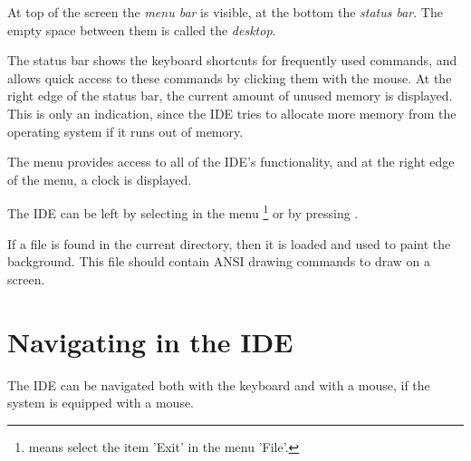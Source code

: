 
At top of the screen the \emph{menu bar} is visible, at the bottom
the \emph{status bar}. The empty space between them is called the
\emph{desktop}.

The status bar shows the keyboard shortcuts for frequently used
commands, and allows quick access to these commands by clicking
them with the mouse.
At the right edge of the status bar, the current amount of unused
memory is displayed. This is only an indication, since the IDE
tries to allocate more memory from the operating system if it
runs out of memory.

The menu provides access to all of the IDE's functionality, and
at the right edge of the menu, a clock is displayed.

The IDE can be left by selecting  in the menu
\footnote{ means select the item 'Exit' in the menu 'File'.}
or by pressing .

\begin{remark}
If a file  is found in the current directory,
then it is loaded and used to paint the background.
This file should contain ANSI drawing commands to draw on a screen.
\end{remark}

\section{Navigating in the IDE}
The IDE can be navigated both with the keyboard and with a mouse, if the
system is equipped with a mouse.
%
%
